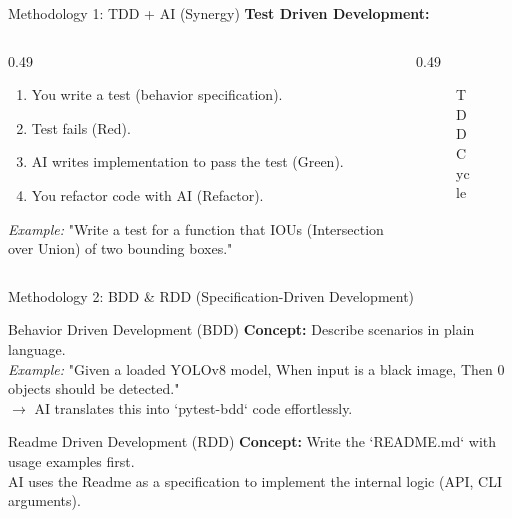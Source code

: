 \documentclass[aspectratio=169]{beamer}
\begin{document}
\begin{frame}[t]{Methodology 1: TDD + AI (Synergy)}
    \textbf{Test Driven Development:}
    \begin{columns}[T,onlytextwidth]
        \begin{column}{0.49\textwidth}
        \begin{enumerate}
        \item You write a test (behavior specification).
        \item Test fails (Red).
        \item AI writes implementation to pass the test (Green).
        \item You refactor code with AI (Refactor).
    \end{enumerate}
    \textit{Example:} "Write a test for a function that IOUs (Intersection over Union) of two bounding boxes."
        \end{column}
        \begin{column}{0.49\textwidth}
            \vspace*{-1cm}
                \begin{figure}
        \centering
        \caption{TDD Cycle}
    \end{figure}
        \end{column}
    \end{columns}
\end{frame}

\begin{frame}[t]{Methodology 2: BDD \& RDD (Specification-Driven Development)}
    \begin{block}{Behavior Driven Development (BDD)}
        \textbf{Concept:} Describe scenarios in plain language.
        \\ \textit{Example:} "Given a loaded YOLOv8 model, When input is a black image, Then 0 objects should be detected."
        \\ $\to$ AI translates this into `pytest-bdd` code effortlessly.
    \end{block}
    \begin{block}{Readme Driven Development (RDD)}
        \textbf{Concept:} Write the `README.md` with usage examples first.
        \\ AI uses the Readme as a specification to implement the internal logic (API, CLI arguments).
    \end{block}
\end{frame}
\end{document}
